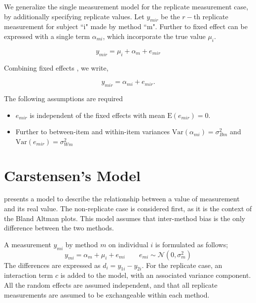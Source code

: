 \documentclass[12pt, a4paper]{report}
\theoremstyle{plain}
\theoremstyle{definition}
\theoremstyle{remark}
\begin{document}
	We generalize the single measurement model for the replicate measurement case, by additionally specifying replicate values. Let $y_{mir}$ be the $r-$th replicate measurement for subject ``i" made by method ``m". Further to \citet{barnhart} fixed effect can be expressed with a single term $\alpha_{mi}$, which incorporate the true value $\mu_i$.
	
	\[ y_{mir} = \mu_{i} + \alpha_{m} + e_{mir}  \]
	
	Combining fixed effects \citep{barnhart}, we write,
	
	\[ y_{mir} = \alpha_{mi} + e_{mir}.\]
	
	The following assumptions are required
	
	\begin{itemize}
		\item $e_{mir}$ is independent of the fixed effects with mean $\mbox{E}(e_{mir}) = 0$.
		\item Further to \citet{barnhart} between-item and within-item variances $\mbox{Var}(\alpha_{mi}) = \sigma^2_{Bm}$ and $\mbox{Var}(e_{mir}) = \sigma^2_{Wm}$
		
	\end{itemize}
	\section{Carstensen's Model}
	
	
	
	\citet{BXC2004} presents a model to describe the relationship between a value of measurement and its
	real value. The non-replicate case is considered first, as it is the context of the Bland Altman plots. This model assumes that inter-method bias is the only difference between the two methods.
	
	A measurement $y_{mi}$ by method $m$ on individual $i$ is formulated as follows;
	\begin{equation}
		y_{mi}  = \alpha_{m} + \mu_{i} + e_{mi} \qquad  e_{mi} \sim
		\mathcal{N}(0,\sigma^{2}_{m})
	\end{equation}
	The differences are expressed as $d_{i} = y_{1i} - y_{2i}$. For the replicate case, an interaction term $c$ is added to the model, with an associated variance component. All the random effects are assumed independent, and that all replicate measurements are assumed to be exchangeable within each method.
	
\end{document}
